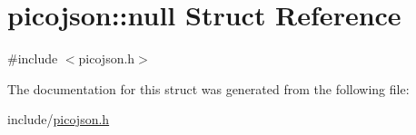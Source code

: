 \hypertarget{structpicojson_1_1null}{}\section{picojson\+:\+:null Struct Reference}
\label{structpicojson_1_1null}


{\ttfamily \#include $<$picojson.\+h$>$}



The documentation for this struct was generated from the following file\+:\begin{DoxyCompactItemize}
\item 
include/\hyperlink{picojson_8h}{picojson.\+h}\end{DoxyCompactItemize}
